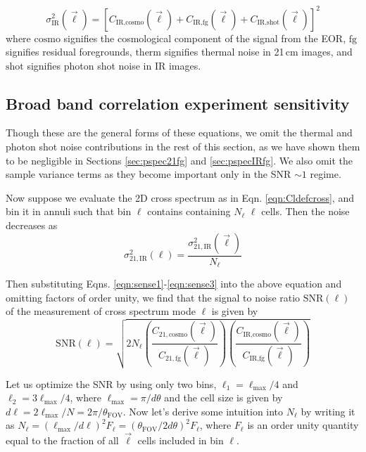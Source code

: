 \documentclass{emulateapj}
\newcommand{\IR}{\text{IR}}
\newcommand{\therm}{\text{therm}}
\newcommand{\cosmo}{\text{cosmo}}
\newcommand{\fg}{\text{fg}}
\newcommand{\shot}{\text{shot}}
\newcommand{\SNR}{\text{SNR}}
\begin{document}
\begin{equation}
\label{eqn:sense3}
	\sigma_{\IR}^2(\vec{\ell})=[C_{\IR,\cosmo}(\vec{\ell})+C_{\IR,\fg}(\vec{\ell})+C_{\IR,\shot}(\vec{\ell})]^2
\end{equation}
where $\cosmo$ signifies the cosmological component of the signal from the EOR, $\fg$ signifies residual foregrounds, $\therm$ signifies thermal noise in 21\,cm images, and $\shot$ signifies photon shot noise in IR images. 

\subsection{Broad band correlation experiment sensitivity}

Though these are the general forms of these equations, we omit the thermal and photon shot noise contributions in the rest of this section, as we have shown them to be negligible in Sections \ref{sec:pspec21fg} and \ref{sec:pspecIRfg}. We also omit the sample variance terms as they become important only in the SNR $\sim1$ regime. 

Now suppose we evaluate the 2D cross spectrum as in Eqn. \ref{eqn:Cldefcross}, and bin it in annuli such that bin $\ell$ contains containing $N_\ell$ $\ell$ cells. Then the noise decreases as
\begin{equation}
	\sigma_{21,\IR}^2(\ell) = \frac{\sigma_{21,\IR}^2(\vec{\ell}) }{N_\ell}
\end{equation}

Then substituting Eqns. \ref{eqn:sense1}-\ref{eqn:sense3} into the above equation and omitting factors of order unity, we find that the signal to noise ratio $\SNR(\ell)$ of the measurement of cross spectrum mode $\ell$ is given by
\begin{equation}
	\SNR(\ell) = \sqrt{
		2N_\ell
	\left(\frac{C_{21,\cosmo}(\vec{\ell})  }{ C_{21,\fg}(\vec{\ell}) }\right)
	\left(\frac{C_{\IR,\cosmo}(\vec{\ell})  }{ C_{\IR,\fg}(\vec{\ell}) }\right)
	}
\end{equation}

Let us optimize the SNR by using only two bins, $\ell_1=\ell_\text{max}/4$ and $\ell_2=3\ell_\text{max}/4$, where $\ell_\text{max}=\pi/d\theta$ and the cell size is given by $d\ell=2\ell_\text{max}/N=2\pi/\theta_\text{FOV}$. Now let's derive some intuition into $N_\ell$ by writing it as $N_\ell=(\ell_\text{max}/d\ell)^2F_\ell=(\theta_\text{FOV}/2d\theta)^2F_\ell$, where $F_\ell$ is an order unity quantity equal to the fraction of all $\vec{\ell}$ cells included in bin $\ell$.
\end{document}
